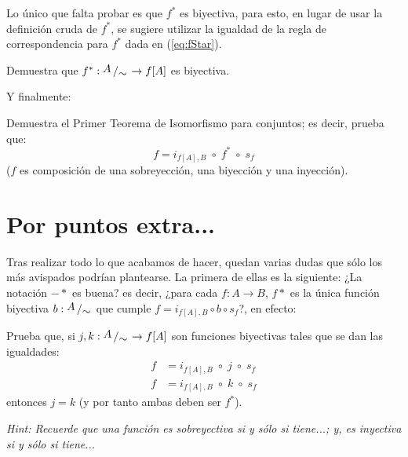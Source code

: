 \documentclass[letterpaper,DIV=14,headsepline,12pt]{scrartcl}
\newcommand{\pts}{}
\newenvironment{ejercicio}[1]{\ifthenelse{\equal{#1}{1} \OR \equal{#1}{+1}}{\renewcommand{\pts}{\textbf{(#1 pt)}}}{\renewcommand{\pts}{\textbf{(#1 pts)}}}\begin{ejj}\upshape \pts}{\end{ejj}}
\newcommand{\quot}[2]{{\raisebox{.2em}{$#1$}\left/\raisebox{-.2em}{$#2$}\right.}}
\begin{document}
    Lo único que falta probar es que $f^*$ es biyectiva, para esto, en lugar de usar la definición cruda de $f^*$, se sugiere utilizar la igualdad de la regla de correspondencia para $f^*$ dada en (\ref{eq:fStar}).

    \begin{ejercicio}{1}
        Demuestra que $f^*:\quot{A}{\sim} \to f[A]$ es biyectiva.
    \end{ejercicio}

    Y finalmente:
    \begin{ejercicio}{.5}
        Demuestra el Primer Teorema de Isomorfismo para conjuntos; es decir, prueba que:
        \[ f=i_{f[A],B} \; \circ \; f^* \; \circ \; s_f \]
        ($f$ es composición de una sobreyección, una biyección y una inyección).
    \end{ejercicio}

    \section*{Por puntos extra...}

    Tras realizar todo lo que acabamos de hacer, quedan varias dudas que sólo los más avispados podrían plantearse. La primera de ellas es la siguiente: ¿La notación $-*$ es buena? es decir, ¿para cada $f:A \to B$, $f*$ es la única función biyectiva $b:\quot{A}{\sim}$ que cumple $f=i_{f[A],B} \circ b \circ s_f$?, en efecto:
    
    \begin{ejercicio}{+2}
        Prueba que, si $j,k:\quot{A}{\sim} \to f[A]$ son funciones biyectivas tales que se dan las igualdades:
        \begin{align*}
            f & = i_{f[A],B} \; \circ \; j \; \circ \; s_f \\
            f & = i_{f[A],B} \; \circ \; k \; \circ \; s_f
        \end{align*}
        entonces $j=k$ (y por tanto ambas deben ser $f^*$).

        \textit{Hint: Recuerde que una función es sobreyectiva si y sólo si tiene...; y, es inyectiva si y sólo si tiene...}
    \end{ejercicio}
\end{document}
